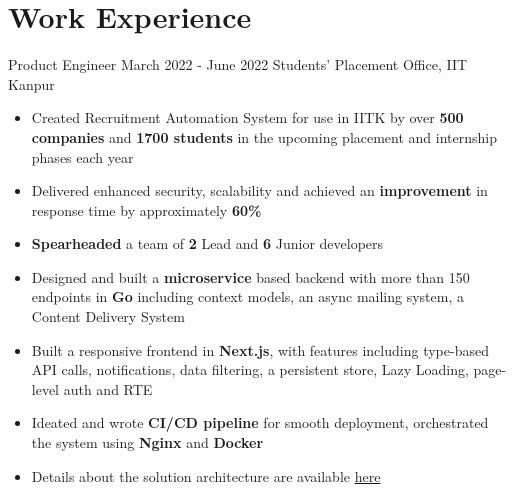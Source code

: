 \section*{\sc Work Experience}
\vspace{-2mm}
\hrulefill
\vspace{1mm}

\excventry
{Product Engineer}
{March 2022 - June 2022}
{Students' Placement Office, IIT Kanpur}
{
  \begin{itemize}
    \item Created Recruitment Automation System for use in IITK by over \textbf{500 companies} and \textbf{1700 students} in the upcoming placement and internship phases each year  
    \item Delivered enhanced security, scalability and achieved an \textbf{improvement} in response time by approximately \textbf{60\%}
    \item \textbf{Spearheaded} a team of \textbf{2} Lead and \textbf{6} Junior developers
    \item Designed and built a \textbf{microservice} based backend with more than 150 endpoints in \textbf{Go} including context models, an async mailing system, a Content Delivery System  
    \item Built a responsive frontend in \textbf{Next.js}, with features including type-based API calls, notifications, data filtering, a persistent store, Lazy Loading, page-level auth and RTE
    \item Ideated and wrote \textbf{CI/CD pipeline} for smooth deployment, orchestrated the system using \textbf{Nginx} and \textbf{Docker}
    \item Details about the solution architecture are available \href{https://abhishekshree.xyz/blog/engineering-ras}{here {\small \faExternalLink{}}}
  \end{itemize}
}


